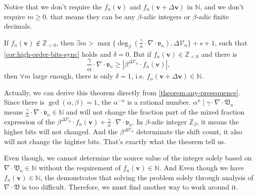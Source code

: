 Notice that we don't require the $f_{n}(\bm{v})$ and $f_{n}(\bm{v} + \Delta\bm{v})$ in $\mathbb{N}$, and we don't require $m \ge 0$. that means they can be any $\beta$-adic integers or $\beta$-adic finite decimals.
\begin{remark}
    If $f_{n}(\bm{v}) \not\in \mathbb{Z}_{<0}$, then $\exists m > \max\{\deg_{\beta}(\frac{\gamma}{\alpha}\cdot\nabla\cdot\mathfrak{v}_{n}), \Delta\mathcal{V}_n\} + s + 1$, such that \cref{cor:high-order-bits-sync} holds and $\delta = 0$. But if $f_{n}(\bm{v}) \in \mathbb{Z}_{<0}$ and there is
    \[ \frac{\gamma}{\alpha}\cdot\nabla\cdot\mathfrak{v}_{n} \ge \left\vert \beta^{\Delta\mathcal{V}_n}\cdot f_{n}(\bm{v}) \right\vert, \]
    then $\forall m$ large enough, there is only $\delta = 1$, i.e. $f_{n}(\bm{v} + \Delta\bm{v}) \in \mathbb{N}$.
\end{remark}
Actually, we can derive this theorem directly from \cref{theorem:any-presequence}.
Since there is $\gcd(\alpha, \beta) = 1$, the $\alpha^{-n}$ is a rational number. $\alpha^{n} \mid \gamma\cdot\nabla\cdot\mathfrak{V}_{n}$ means $\frac{\gamma}{\alpha}\cdot\nabla\cdot\mathfrak{v}_{n} \in \mathbb{N}$ and will not change the fraction part of the mixed fraction expression of the $\beta^{\Delta\mathcal{V}_{n}}\cdot f_{n}(\bm{v}) + \frac{\gamma}{\alpha} \cdot \nabla\cdot\mathfrak{v}_{n}$.
In $\beta$-adic integer $\mathbb{Z}_{\beta}$, it means the higher bits will not changed.
And the $\beta^{\Delta\mathcal{V}_{n}}$ determinate the shift count, it also will not change the highter bits. That's exactly what the theorem tell us.

Even though, we cannot determine the source value of the integer solely based on $\nabla\cdot\mathfrak{V}_{n}\in\mathbb{N}$ without the requirement of $f_{n}(\bm{v})\in\mathbb{N}$. And Even though we have $f_{n}(\bm{v})\in\mathbb{N}$, the demonstrates that solving the problem solely through analysis of $\nabla\cdot\mathfrak{V}$ is too difficult. Therefore, we must find another way to work around it.

